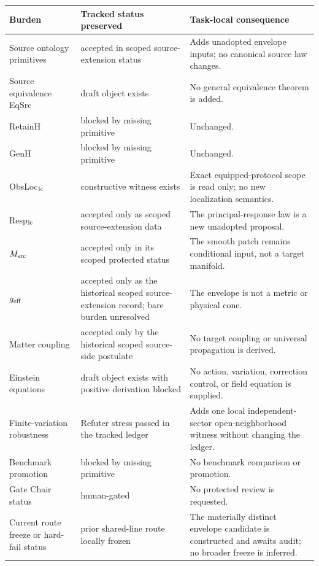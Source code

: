 \documentclass[11pt]{article}
\begin{document}
\begin{longtable}{>{\raggedright\arraybackslash}p{}>{\raggedright\arraybackslash}p{}>{\raggedright\arraybackslash}p{}}
\toprule
Burden & Tracked status preserved & Task-local consequence\\
\midrule
Source ontology primitives & accepted in scoped source-extension status & Adds unadopted envelope inputs; no canonical source law changes.\\
Source equivalence EqSrc & draft object exists & No general equivalence theorem is added.\\
RetainH & blocked by missing primitive & Unchanged.\\
GenH & blocked by missing primitive & Unchanged.\\
ObsLoc\(_{\rm lc}\) & constructive witness exists & Exact equipped-protocol scope is read only; no new localization semantics.\\
Resp\(_{\rm lc}\) & accepted only as scoped source-extension data & The principal-response law is a new unadopted proposal.\\
\(M_{\rm src}\) & accepted only in its scoped protected status & The smooth patch remains conditional input, not a target manifold.\\
\(g_{\rm eff}\) & accepted only as the historical scoped source-extension record; bare burden unresolved & The envelope is not a metric or physical cone.\\
Matter coupling & accepted only by the historical scoped source-side postulate & No target coupling or universal propagation is derived.\\
Einstein equations & draft object exists with positive derivation blocked & No action, variation, correction control, or field equation is supplied.\\
Finite-variation robustness & Refuter stress passed in the tracked ledger & Adds one local independent-sector open-neighborhood witness without changing the ledger.\\
Benchmark promotion & blocked by missing primitive & No benchmark comparison or promotion.\\
Gate Chair status & human-gated & No protected review is requested.\\
Current route freeze or hard-fail status & prior shared-line route locally frozen & The materially distinct envelope candidate is constructed and awaits audit; no broader freeze is inferred.\\
\bottomrule
\end{longtable}
\end{document}
